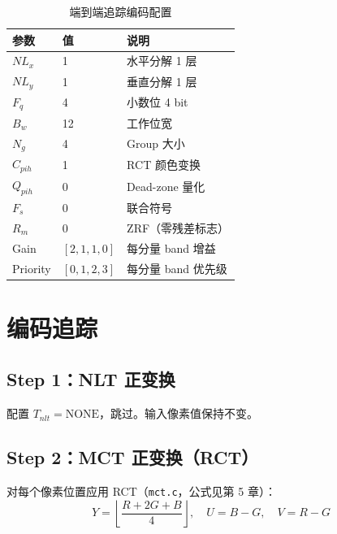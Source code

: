 \begin{table}[H]
\centering
\caption{端到端追踪编码配置}
\label{tab:e2e-config}
\begin{tabular}{@{}lll@{}}
\toprule
参数 & 值 & 说明 \\
\midrule
$NL_x$ & 1 & 水平分解 1 层 \\
$NL_y$ & 1 & 垂直分解 1 层 \\
$F_q$ & 4 & 小数位 4 bit \\
$B_w$ & 12 & 工作位宽 \\
$N_g$ & 4 & Group 大小 \\
$C_{pih}$ & 1 & RCT 颜色变换 \\
$Q_{pih}$ & 0 & Dead-zone 量化 \\
$F_s$ & 0 & 联合符号 \\
$R_m$ & 0 & ZRF（零残差标志） \\
Gain & $[2, 1, 1, 0]$ & 每分量 band 增益 \\
Priority & $[0, 1, 2, 3]$ & 每分量 band 优先级 \\
\bottomrule
\end{tabular}
\end{table}

\section{编码追踪}

\subsection{Step 1：NLT 正变换}

配置 $T_{nlt} = \mathrm{NONE}$，跳过。输入像素值保持不变。

\subsection{Step 2：MCT 正变换（RCT）}

对每个像素位置应用 RCT（\texttt{mct.c}，公式见第 5 章）：
\begin{equation}
Y = \left\lfloor \frac{R + 2G + B}{4} \right\rfloor, \quad U = B - G, \quad V = R - G
\end{equation}

